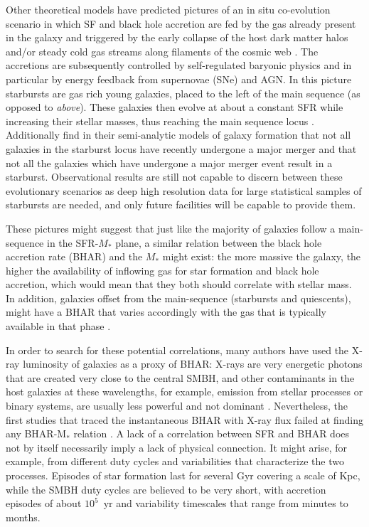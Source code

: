     Other theoretical models have predicted pictures of an in situ co-evolution scenario in which SF and black hole accretion are fed by the gas already present in the galaxy and triggered by the early collapse of the host dark matter halos  \citep[e.g.][]{2006ApJ...650...42L, 2011ApJ...742...24L, 2014ApJ...782...69L, 2013ApJ...772..119L,2015ApJ...810...74A, 2016ApJ...833..152M} and/or steady cold gas streams along filaments of the cosmic web  \citep[e.g.][]{2009Natur.457..451D, 2011ApJ...741L..33B}. The accretions are subsequently controlled by self-regulated baryonic physics and in particular by energy feedback from supernovae (SNe) and AGN. In this picture starbursts are gas rich young galaxies, placed to the left of the main sequence (as opposed to \textit{above}). These galaxies then evolve at about a constant SFR while increasing their stellar masses, thus reaching the main sequence locus \citep{2016ApJ...833..152M, 2018ApJ...857...22L}. Additionally \citet{2019MNRAS.482.4454W} find in their semi-analytic models of galaxy formation that not all galaxies in the starburst locus have recently undergone a major merger and that not all the galaxies which have undergone a major merger event result in a starburst.
    Observational results are still not capable to discern between these evolutionary scenarios as deep high resolution data for large statistical samples of starbursts are needed, and only future facilities will be capable to provide them. 
    
    These pictures might suggest that just like the majority of galaxies follow a main-sequence in the SFR-$M_*$ plane, a similar relation between the black hole accretion rate (BHAR) and the $M_*$ might exist: the more massive the galaxy, the higher the availability of inflowing gas for star formation and black hole accretion, which would mean that they both should correlate with stellar mass. In addition, galaxies offset from the main-sequence (starbursts and quiescents), might have a BHAR that varies accordingly with the gas that is typically available in that phase \citep{2019ApJ...877L..38R}. 
    
    In order to search for these potential correlations, many authors have used the X-ray luminosity of galaxies as a proxy of BHAR: X-rays are very energetic photons that are created very close to the central SMBH, and other contaminants in the host galaxies at these wavelengths, for example, emission from stellar processes or binary systems, are usually less powerful and not dominant \citep[e.g.][]{2015A&ARv..23....1B}. Nevertheless, the first studies that traced the instantaneous BHAR with X-ray flux failed at finding any BHAR-M$_*$ relation \citep{2009ApJ...696..396S, 2010A&A...518L..26S, 2012MNRAS.419...95M, 2012A&A...545A..45R, 2015ApJ...806..187A}. A lack of a correlation between SFR and BHAR does not by itself necessarily imply a lack of physical connection. It might arise, for example, from different duty cycles and variabilities that characterize the two processes.  
    Episodes of star formation last for several Gyr covering a scale of Kpc, while the SMBH duty cycles are believed to be very short, with accretion episodes of about $10^5$~yr and variability timescales that range from minutes to months.
    
